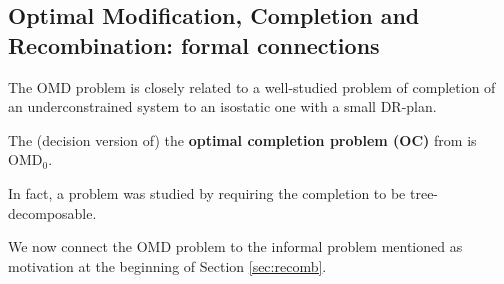 %
\subsection{Optimal Modification, Completion and Recombination: formal
connections}
%
The OMD problem is closely related to a well-studied problem of
completion of an underconstrained system to an isostatic one with a
small DR-plan.
\begin{observation}\label{obs:OC_to_OMD}
    The (decision version of) the \textbf{optimal completion problem
    (OC)} from \cite{sitharam2005combinatorial,joan-arinyo2003transforming,zhang-gao2006well} is OMD$_0$.
\end{observation}
In fact, a  problem was studied by \cite{joan-arinyo2003transforming}
requiring the completion to be tree-decomposable.

We now connect the OMD problem to the informal  problem mentioned as motivation at the beginning
of Section \ref{sec:recomb}.

